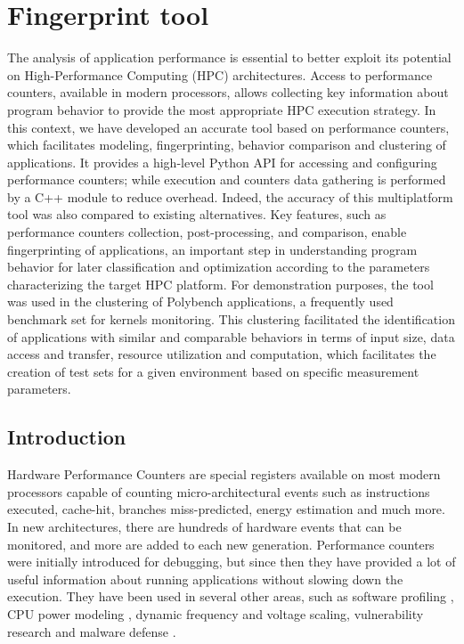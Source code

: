 \section{Fingerprint tool}
The analysis of application performance is essential to better exploit its potential on High-Performance Computing (HPC) architectures. Access to performance counters, available in modern processors, allows collecting key information about program behavior to provide the most appropriate HPC execution strategy.
In this context, we have developed an accurate tool based on performance counters, which facilitates modeling, fingerprinting, behavior comparison and clustering of applications.
It provides a high-level Python API for accessing and configuring performance counters; while execution and counters data gathering is  performed by a C++ module to reduce overhead. 
Indeed, the accuracy of this multiplatform tool was also compared to existing alternatives.  
Key features, such as performance counters collection, post-processing, and comparison, enable fingerprinting of applications, an important step in understanding program behavior for later classification and optimization according to the parameters characterizing the target HPC platform.
For demonstration purposes, the tool was used in the clustering of Polybench applications, a frequently used benchmark set for kernels monitoring. 
This clustering facilitated the identification of applications with similar and comparable behaviors in terms of input size, data access and transfer, resource utilization and computation, which facilitates the creation of test sets for a given environment based on specific measurement parameters.


\subsection{Introduction}

Hardware Performance Counters are special registers available on most modern processors capable of counting micro-architectural events such as instructions executed, cache-hit, branches miss-predicted, energy estimation and much more.  In new architectures, there are hundreds of hardware events that can be monitored, and more are added to each new generation. 
Performance counters were initially introduced for debugging, but since then they have provided a lot of useful information about running applications without slowing down the execution.
They have been used in several other areas, such as software profiling \cite{Melo2010Perf, Kufrin2005Perfsuite, Knupfer2011Scorep}, CPU power modeling \cite{Zamani2012ASystems}, dynamic frequency and voltage scaling, vulnerability research and malware defense \cite{Demme2013OnCounters}.

